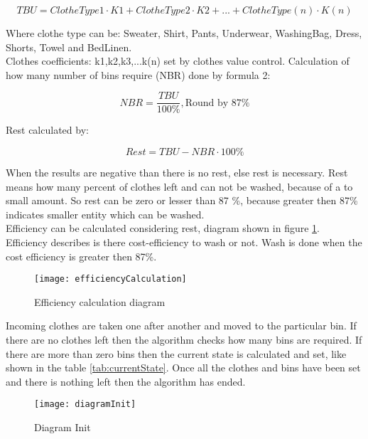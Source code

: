 \begin{equation}
TBU=ClotheType1\cdot K1+ClotheType2\cdot K2+...+ClotheType(n)\cdot K(n) \label{eq:eq1}
\end{equation}

Where clothe type can be: Sweater, Shirt, Pants, Underwear, WashingBag, Dress, Shorts, Towel and BedLinen. 
\\
Clothes coefficients: k1,k2,k3,...k(n) set by clothes value control.
Calculation of how many number of bins require (NBR) done by formula 2:  

\begin{equation}
NBR=\frac{TBU}{100\%},\textrm{Round by 87\%} \label{eq:eq2}
\end{equation}

Rest calculated by:

\begin{equation}
Rest=TBU-NBR\cdot 100\% \label{eq:eq3}
\end{equation}

When the results are negative than there is no rest, else rest is necessary. Rest means how many percent of clothes left and can not be washed, because of a to small amount. So rest can be zero or lesser than 87 \%, because greater then 87\% indicates smaller entity which can be washed.
\\
Efficiency can be calculated considering rest, diagram shown in figure \ref{fig:efficiencyCalculation}. Efficiency describes is there cost-efficiency to wash or not. Wash is done when the cost efficiency is greater then 87\%.

\begin{figure}[h]
	\centering
		\texttt{[image: efficiencyCalculation]}
	\caption{Efficiency calculation diagram}
	\label{fig:efficiencyCalculation}
\end{figure}

Incoming clothes are taken one after another and moved to the particular bin. If there are no clothes left then the algorithm checks how many bins are required. If there are more than zero bins then the current state is calculated and set, like shown in the table \ref{tab:currentState}. Once all the clothes and bins have been set and there is nothing left then the algorithm has ended. \newpage

\begin{figure}[h]
	\centering
		\texttt{[image: diagramInit]}
	\caption{Diagram Init}
	\label{fig:planning}
\end{figure}

